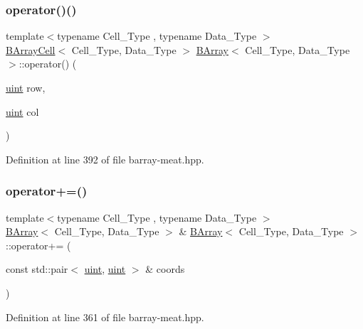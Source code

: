 \subsubsection{\texorpdfstring{operator()()}{operator()()}}
{\footnotesize\ttfamily template$<$typename Cell\+\_\+\+Type , typename Data\+\_\+\+Type $>$ \\
\hyperlink{class_b_array_cell}{B\+Array\+Cell}$<$ Cell\+\_\+\+Type, Data\+\_\+\+Type $>$ \hyperlink{class_b_array}{B\+Array}$<$ Cell\+\_\+\+Type, Data\+\_\+\+Type $>$\+::operator() (\begin{DoxyParamCaption}\item[{\hyperlink{typedefs_8hpp_a91ad9478d81a7aaf2593e8d9c3d06a14}{uint}}]{row,  }\item[{\hyperlink{typedefs_8hpp_a91ad9478d81a7aaf2593e8d9c3d06a14}{uint}}]{col }\end{DoxyParamCaption})\hspace{0.3cm}{\ttfamily [inline]}}



Definition at line 392 of file barray-\/meat.\+hpp.

\mbox{\label{class_b_array_a706ee6da2f9a232970d286ccdd944d50}} 
\subsubsection{\texorpdfstring{operator+=()}{operator+=()}}
{\footnotesize\ttfamily template$<$typename Cell\+\_\+\+Type , typename Data\+\_\+\+Type $>$ \\
\hyperlink{class_b_array}{B\+Array}$<$ Cell\+\_\+\+Type, Data\+\_\+\+Type $>$ \& \hyperlink{class_b_array}{B\+Array}$<$ Cell\+\_\+\+Type, Data\+\_\+\+Type $>$\+::operator+= (\begin{DoxyParamCaption}\item[{const std\+::pair$<$ \hyperlink{typedefs_8hpp_a91ad9478d81a7aaf2593e8d9c3d06a14}{uint}, \hyperlink{typedefs_8hpp_a91ad9478d81a7aaf2593e8d9c3d06a14}{uint} $>$ \&}]{coords }\end{DoxyParamCaption})\hspace{0.3cm}{\ttfamily [inline]}}



Definition at line 361 of file barray-\/meat.\+hpp.

\mbox{\label{class_b_array_ae5dc994ddca6944654e05bf813a8b402}} 
